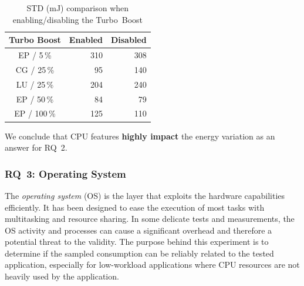 \begin{table}%
    \centering
    \caption{STD (mJ) comparison when enabling/disabling the Turbo~Boost}
    \label{table:turboboost}
    \small
    \begin{tabular}{|c|r|r|}
        \hline
        \textbf{Turbo Boost}  & \textbf{Enabled} & \textbf{Disabled} \\
        \hline
        \hline
        \textsf{EP} / 5\,\%   & 310              & 308               \\
        \hline
        \textsf{CG} / 25\,\%  & 95               & 140               \\
        \hline
        \textsf{LU} / 25\,\%  & 204              & 240               \\
        \hline
        \textsf{EP} / 50\,\%  & 84               & 79                \\
        \hline
        \textsf{EP} / 100\,\% & 125              & 110               \\
        \hline
    \end{tabular}
\end{table}


\begin{mdframed}[skipabove=\topsep,skipbelow=\topsep]
    We conclude that CPU features \textbf{highly impact} the energy variation as an answer for \textsc{RQ~2}.
\end{mdframed}

\subsubsection{\textsc{RQ}~3: Operating System}
The \emph{operating system} (OS) is the layer that exploits the hardware capabilities efficiently.
It has been designed to ease the execution of most tasks with multitasking and resource sharing.
In some delicate tests and measurements, the OS activity and processes can cause a significant overhead and therefore a potential threat to the validity. %
The purpose behind this experiment is to determine if the sampled consumption can be reliably related to the tested application, especially for low-workload applications where CPU resources are not heavily used by the application.

